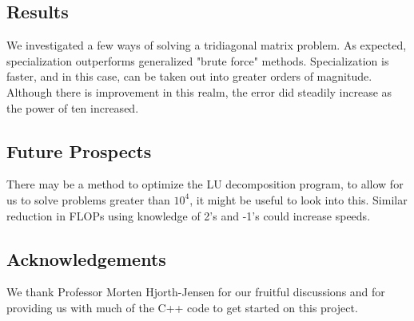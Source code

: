 \documentclass[10pt,showpacs,preprintnumbers,footinbib,amsmath,amssymb,aps,prl,twocolumn,groupedaddress,superscriptaddress,showkeys]{revtex4-1}
\begin{document}
\subsection{Results}
	We investigated a few ways of solving a tridiagonal matrix problem. As expected, specialization outperforms generalized "brute force" methods. Specialization is faster, and in this case, can be taken out into greater orders of magnitude. Although there is improvement in this realm, the error did steadily increase as the power of ten increased.

	\subsection{Future Prospects}
	There may be a method to optimize the LU decomposition program, to allow for us to solve problems greater than $10^{4}$, it might be useful to look into this. Similar reduction in FLOPs using knowledge of 2's and -1's could increase speeds.

        \subsection{Acknowledgements}
        We thank Professor Morten Hjorth-Jensen for our fruitful discussions and for providing us with much of the C++ code to get started on this project. 
\end{document}
